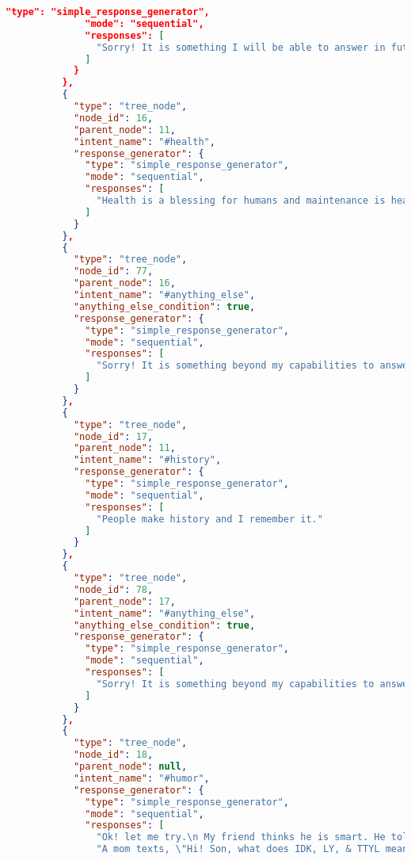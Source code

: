 \begin{appendix}
\begin{lstlisting}[language=json, firstnumber=1]
              "type": "simple_response_generator",
              "mode": "sequential",
              "responses": [
                "Sorry! It is something I will be able to answer in future."
              ]
            }
          },
          {
            "type": "tree_node",
            "node_id": 16,
            "parent_node": 11,
            "intent_name": "#health",
            "response_generator": {
              "type": "simple_response_generator",
              "mode": "sequential",
              "responses": [
                "Health is a blessing for humans and maintenance is health for me."
              ]
            }
          },
          {
            "type": "tree_node",
            "node_id": 77,
            "parent_node": 16,
            "intent_name": "#anything_else",
            "anything_else_condition": true,
            "response_generator": {
              "type": "simple_response_generator",
              "mode": "sequential",
              "responses": [
                "Sorry! It is something beyond my capabilities to answer for now. I will get trained for it in future."
              ]
            }
          },
          {
            "type": "tree_node",
            "node_id": 17,
            "parent_node": 11,
            "intent_name": "#history",
            "response_generator": {
              "type": "simple_response_generator",
              "mode": "sequential",
              "responses": [
                "People make history and I remember it."
              ]
            }
          },
          {
            "type": "tree_node",
            "node_id": 78,
            "parent_node": 17,
            "intent_name": "#anything_else",
            "anything_else_condition": true,
            "response_generator": {
              "type": "simple_response_generator",
              "mode": "sequential",
              "responses": [
                "Sorry! It is something beyond my capabilities to answer it. I will be able to handle it well in my next version."
              ]
            }
          },
          {
            "type": "tree_node",
            "node_id": 18,
            "parent_node": null,
            "intent_name": "#humor",
            "response_generator": {
              "type": "simple_response_generator",
              "mode": "sequential",
              "responses": [
                "Ok! let me try.\n My friend thinks he is smart. He told me an onion is the only food that makes you cry, so I threw a coconut at his face :D",
                "A mom texts, \"Hi! Son, what does IDK, LY, & TTYL mean?\" He texts back, \"I Don't Know, Love You, & Talk To You Later.\" The mom texts him, \"It's ok, don't worry about it. I'll ask your sister, love you too.\"",

\end{lstlisting}
\end{appendix}
